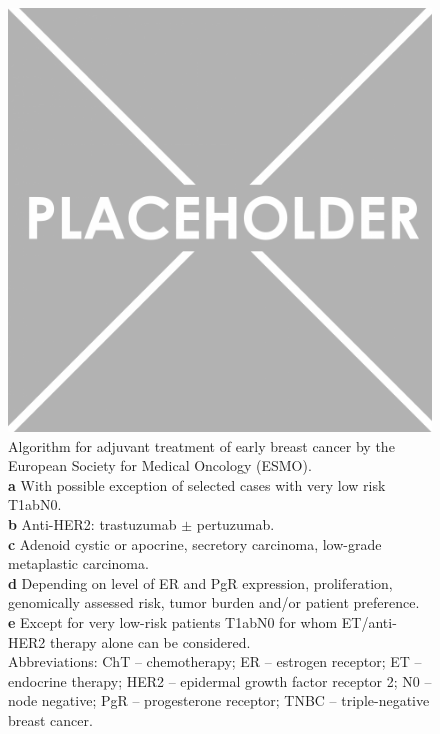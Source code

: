 \documentclass[11pt]{book}
\begin{document}
\begin{figure}
\centering
\includegraphics[scale=0.3]{img/placeholder.png}
\caption[ESMO Adjuvant Treatment Algorithm]{Algorithm for adjuvant treatment of early breast cancer by the European Society for Medical Oncology (ESMO).\\
\textbf{a} With possible exception of selected cases with very low risk T1abN0.\\
\textbf{b} Anti-HER2: trastuzumab $\pm$ pertuzumab. \\
\textbf{c} Adenoid cystic or apocrine, secretory carcinoma, low-grade metaplastic carcinoma.\\
\textbf{d} Depending on level of ER and PgR expression, proliferation, genomically assessed risk, tumor burden and/or patient preference. \\ 
\textbf{e} Except for very low-risk patients T1abN0 for whom ET/anti-HER2 therapy alone can be considered. \\
Abbreviations: ChT -- chemotherapy; ER -- estrogen receptor; ET --  endocrine therapy; HER2 -- epidermal growth factor receptor 2; N0 -- node negative; PgR -- progesterone receptor; TNBC -- triple-negative breast cancer.}
\label{fig:adjuvant-treatments}
\end{figure}
\end{document}
